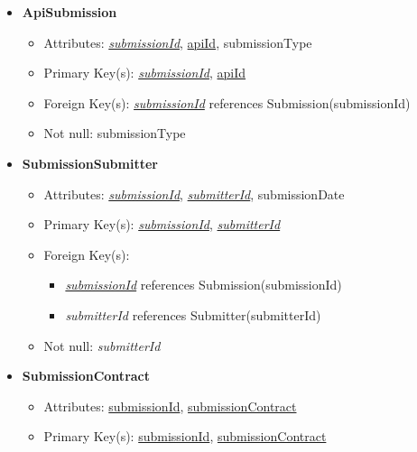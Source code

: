 \documentclass{article}
\begin{document}
\begin{itemize}
        \item \textbf{ApiSubmission}
        \begin{itemize}
            \item Attributes: \underline{\textit{submissionId}}, \underline{apiId}, submissionType
            \item Primary Key(s): \underline{\textit{submissionId}}, \underline{apiId}
            \item Foreign Key(s): \underline{\textit{submissionId}} references Submission(submissionId)
            \item Not null: submissionType
        \end{itemize}

        \item \textbf{SubmissionSubmitter}
        \begin{itemize}
            \item Attributes: \underline{\textit{submissionId}}, \underline{\textit{submitterId}}, submissionDate
            \item Primary Key(s): \underline{\textit{submissionId}}, \underline{\textit{submitterId}}
            \item Foreign Key(s): 
            \begin{itemize}
                \item \underline{\textit{submissionId}} references Submission(submissionId)
                \item \textit{submitterId} references Submitter(submitterId)
            \end{itemize}
            \item Not null: \textit{submitterId}
        \end{itemize}

        \item \textbf{SubmissionContract}
        \begin{itemize}
            \item Attributes: \underline{submissionId}, \underline{submissionContract}
            \item Primary Key(s): \underline{submissionId}, \underline{submissionContract}
        \end{itemize}


\end{itemize}
\end{document}
